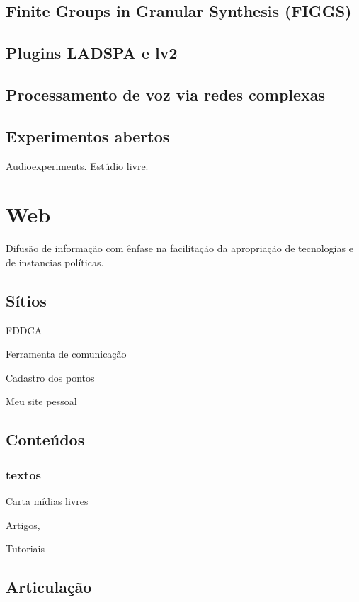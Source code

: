 \subsection{Finite Groups in Granular Synthesis (FIGGS)}

\subsection{Plugins LADSPA e lv2}

\subsection{Processamento de voz via redes complexas}

\subsection{Experimentos abertos}

Audioexperiments. Estúdio livre.


\section{Web}

Difusão de informação com ênfase na facilitação
da apropriação de tecnologias e de instancias políticas.

\subsection{Sítios}

FDDCA

Ferramenta de comunicação

Cadastro dos pontos

Meu site pessoal

\subsection{Conteúdos}

\subsubsection{textos}
Carta mídias livres

Artigos,

Tutoriais

\subsection{Articulação}

